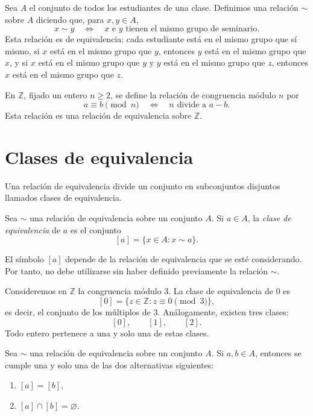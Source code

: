 \begin{ejemplo}
Sea \(A\) el conjunto de todos los estudiantes de una clase. Definimos una relación \(\sim\) sobre \(A\) diciendo que, para \(x,y\in A\),
\[
x\sim y \quad \Longleftrightarrow \quad x\text{ e }y\text{ tienen el mismo grupo de seminario}.
\]
Esta relación es de equivalencia: cada estudiante está en el mismo grupo que sí mismo, si \(x\) está en el mismo grupo que \(y\), entonces \(y\) está en el mismo grupo que \(x\), y si \(x\) está en el mismo grupo que \(y\) y \(y\) está en el mismo grupo que \(z\), entonces \(x\) está en el mismo grupo que \(z\).
\end{ejemplo}

\begin{ejemplo}
En \(\mathbb{Z}\), fijado un entero \(n\geq 2\), se define la relación de congruencia módulo \(n\) por
\[
a\equiv b\pmod n
\quad \Longleftrightarrow \quad
n \text{ divide a } a-b.
\]
Esta relación es una relación de equivalencia sobre \(\mathbb{Z}\).
\end{ejemplo}

\section{Clases de equivalencia}

Una relación de equivalencia divide un conjunto en subconjuntos disjuntos llamados clases de equivalencia.

\begin{definicion}
Sea \(\sim\) una relación de equivalencia sobre un conjunto \(A\). Si \(a\in A\), la \emph{clase de equivalencia} de \(a\) es el conjunto
\[
[a]=\{x\in A:x\sim a\}.
\]
\end{definicion}

El símbolo \([a]\) depende de la relación de equivalencia que se esté considerando. Por tanto, no debe utilizarse sin haber definido previamente la relación \(\sim\).

\begin{ejemplo}
Consideremos en \(\mathbb{Z}\) la congruencia módulo \(3\). La clase de equivalencia de \(0\) es
\[
[0]=\{z\in\mathbb{Z}:z\equiv 0\pmod 3\},
\]
es decir, el conjunto de los múltiplos de \(3\). Análogamente, existen tres clases:
\[
[0],\qquad [1],\qquad [2].
\]
Todo entero pertenece a una y solo una de estas clases.
\end{ejemplo}

\begin{proposicion}
Sea \(\sim\) una relación de equivalencia sobre un conjunto \(A\). Si \(a,b\in A\), entonces se cumple una y solo una de las dos alternativas siguientes:
\begin{enumerate}
  \item \([a]=[b]\),
  \item \([a]\cap[b]=\varnothing\).
\end{enumerate}
\end{proposicion}

